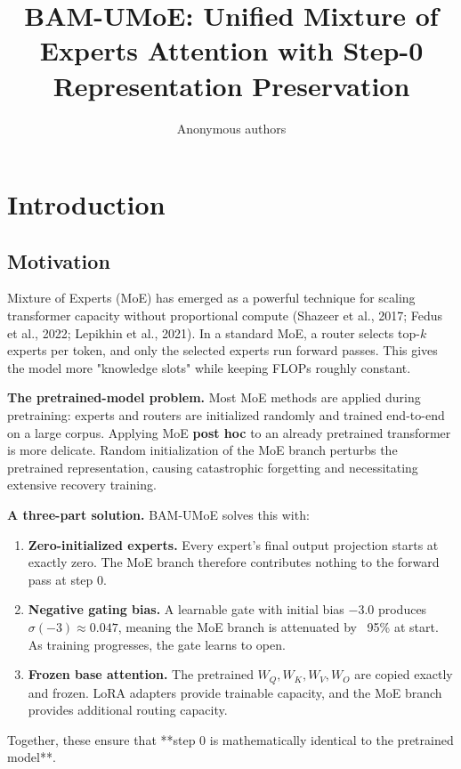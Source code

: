 \title{\textbf{BAM-UMoE: Unified Mixture of Experts Attention with Step-0 Representation Preservation}}

\author{Anonymous authors}


\section{Introduction}

\subsection{Motivation}

Mixture of Experts (MoE) has emerged as a powerful technique for scaling 
transformer capacity without proportional compute (Shazeer et al., 2017; 
Fedus et al., 2022; Lepikhin et al., 2021). In a standard MoE, a router 
selects top-$k$ experts per token, and only the selected experts run forward 
passes. This gives the model more "knowledge slots" while keeping FLOPs 
roughly constant.

\textbf{The pretrained-model problem.} Most MoE methods are applied during 
pretraining: experts and routers are initialized randomly and trained 
end-to-end on a large corpus. Applying MoE \textbf{post hoc} to an already 
pretrained transformer is more delicate. Random initialization of the MoE 
branch perturbs the pretrained representation, causing catastrophic 
forgetting and necessitating extensive recovery training.

\textbf{A three-part solution.} BAM-UMoE solves this with:

\begin{enumerate}
\item \textbf{Zero-initialized experts.} Every expert's final output projection
  starts at exactly zero. The MoE branch therefore contributes nothing
  to the forward pass at step 0.

\item \textbf{Negative gating bias.} A learnable gate with initial bias $-3.0$
  produces $\sigma(-3) \approx 0.047$, meaning the MoE branch is attenuated
  by ~95\% at start. As training progresses, the gate learns to open.

\item \textbf{Frozen base attention.} The pretrained $W_Q, W_K, W_V, W_O$ are copied
  exactly and frozen. LoRA adapters provide trainable capacity, and the MoE
  branch provides additional routing capacity.

\end{enumerate}
Together, these ensure that **step 0 is mathematically identical to the 
pretrained model**.


